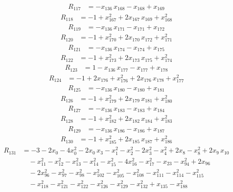 \begin{align*}
R_{117} &= -x_{136}\,x_{168} -x_{168} +x_{169}
\end{align*}
\begin{align*}
R_{118} &= -1 +x_{167}^{2} +2x_{167}\,x_{169} +x_{168}^{2}
\end{align*}
\begin{align*}
R_{119} &= -x_{136}\,x_{171} -x_{171} +x_{172}
\end{align*}
\begin{align*}
R_{120} &= -1 +x_{170}^{2} +2x_{170}\,x_{172} +x_{171}^{2}
\end{align*}
\begin{align*}
R_{121} &= -x_{136}\,x_{174} -x_{174} +x_{175}
\end{align*}
\begin{align*}
R_{122} &= -1 +x_{173}^{2} +2x_{173}\,x_{175} +x_{174}^{2}
\end{align*}
\begin{align*}
R_{123} &= 1 -x_{136}\,x_{177} -x_{177} +x_{178}
\end{align*}
\begin{align*}
R_{124} &= -1 +2x_{176} +x_{176}^{2} +2x_{176}\,x_{178} +x_{177}^{2}
\end{align*}
\begin{align*}
R_{125} &= -x_{136}\,x_{180} -x_{180} +x_{181}
\end{align*}
\begin{align*}
R_{126} &= -1 +x_{179}^{2} +2x_{179}\,x_{181} +x_{180}^{2}
\end{align*}
\begin{align*}
R_{127} &= -x_{136}\,x_{183} -x_{183} +x_{184}
\end{align*}
\begin{align*}
R_{128} &= -1 +x_{182}^{2} +2x_{182}\,x_{184} +x_{183}^{2}
\end{align*}
\begin{align*}
R_{129} &= -x_{136}\,x_{186} -x_{186} +x_{187}
\end{align*}
\begin{align*}
R_{130} &= -1 +x_{185}^{2} +2x_{185}\,x_{187} +x_{186}^{2}
\end{align*}
\begin{align*}
R_{131} &= -3 -2x_{0} -4x_{0}^{2} -2x_{0}\,x_{3} -x_{1}^{2} -x_{2}^{2} -2x_{3}^{2} -x_{4}^{2} +2x_{8} -x_{8}^{2} +2x_{9}\,x_{10} \\
&\quad {} -x_{11}^{2} -x_{12}^{2} -x_{13}^{2} -x_{14}^{2} -x_{15}^{2} -4x_{16}^{2} -x_{17}^{2} -x_{23} -x_{94}^{2} +2x_{96} \\
&\quad {} -2x_{96}^{2} -x_{97}^{2} -x_{98}^{2} -x_{102}^{2} -x_{105}^{2} -x_{108}^{2} -x_{111}^{2} -x_{114}^{2} -x_{115}^{2} \\
&\quad {} -x_{118}^{2} -x_{121}^{2} -x_{122}^{2} -x_{126}^{2} -x_{129}^{2} -x_{132}^{2} +x_{135} -x_{188}^{2}
\end{align*}
